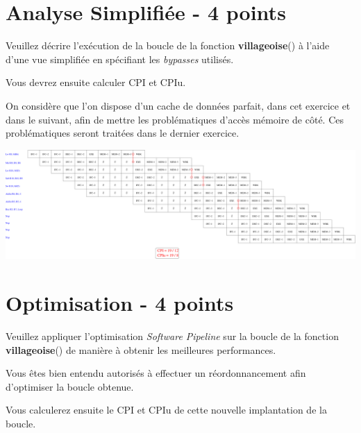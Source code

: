 {\begin{correction}
\end{correction}

%
%

\section{Analyse Simplifi\'ee - 4 points}

Veuillez d\'ecrire l'ex\'ecution de la boucle de la fonction
\textbf{villageoise}() \`a l'aide d'une vue simplifi\'ee en sp\'ecifiant les
\textit{bypasses} utilis\'es.

Vous devrez ensuite calculer CPI et CPIu.

On consid\`ere que l'on dispose d'un cache de donn\'ees parfait, dans cet
exercice et dans le suivant, afin de mettre les probl\'ematiques d'acc\`es
m\'emoire de c\^ot\'e. Ces probl\'ematiques seront trait\'ees dans le
dernier exercice.

\begin{correction}

  \begin{center}
    \includegraphics[scale=0.25]{figures/correction-analyse-simplifiee.pdf}
  \end{center}

\end{correction}

%
%

\section{Optimisation - 4 points}

Veuillez appliquer l'optimisation \textit{Software Pipeline} sur
la boucle de la fonction \textbf{villageoise}() de mani\`ere \`a obtenir
les meilleures performances.

Vous \^etes bien entendu autoris\'es \`a effectuer un r\'eordonnancement
afin d'optimiser la boucle obtenue.

Vous calculerez ensuite le CPI et CPIu de cette nouvelle implantation
de la boucle.

}
